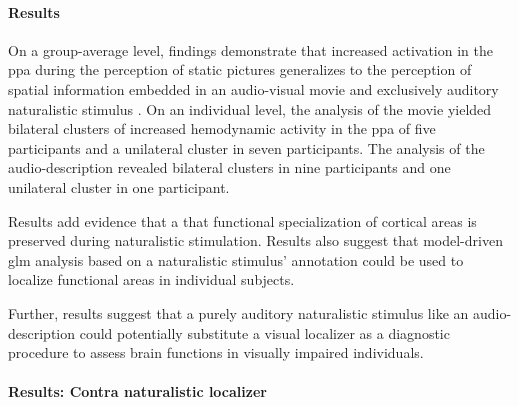 \paragraph{Results}






On a group-average level, findings demonstrate that increased activation in the
\ac{ppa} during the perception of static pictures generalizes to the perception
of spatial information embedded in an audio-visual movie and exclusively
auditory naturalistic stimulus \citep{haeusler2022processing}.
On an individual level, the analysis of the movie yielded bilateral
clusters of increased hemodynamic activity in the \ac{ppa} of five participants
and a unilateral cluster in seven participants.
%
The analysis of the audio-description revealed bilateral clusters in nine
participants and one unilateral cluster in one participant.

Results add evidence \citep[cf.][]{bartels2004mapping} that a that functional
specialization of cortical areas is preserved during naturalistic stimulation.
%
Results also suggest that model-driven \ac{glm} analysis based on a naturalistic
stimulus' annotation could be used to localize functional areas in individual
subjects.

Further, results suggest that a purely auditory naturalistic stimulus like an
audio-description could potentially substitute a visual localizer as a
diagnostic procedure to assess brain functions in visually impaired individuals.




\paragraph{Results: Contra naturalistic localizer}


